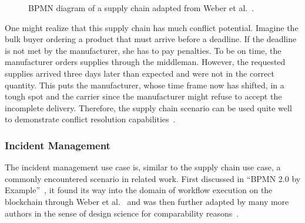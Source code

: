\begin{figure}[h]
    \caption{BPMN diagram of a supply chain adapted from Weber et al.~\cite{untrusted_bp_execution_using_blockchain}.}
    \label{fig:evaluation:simulations:supply_chain_full}
\end{figure}

One might realize that this supply chain has much conflict potential. Imagine the bulk buyer ordering a product that must arrive before a deadline. If the deadline is not met by the manufacturer, she has to pay penalties. To be on time, the manufacturer orders supplies through the middleman. However, the requested supplies arrived three days later than expected and were not in the correct quantity. This puts the manufacturer, whose time frame now has shifted, in a tough spot and the carrier since the manufacturer might refuse to accept the incomplete delivery. Therefore, the supply chain scenario can be used quite well to demonstrate conflict resolution capabilities~\cite{untrusted_bp_execution_using_blockchain,interpreted_bp_on_blockchain_loukil}.

\subsubsection{Incident Management}
\label{sec:evaluation:simulations:descriptions:im}
The incident management use case is, similar to the supply chain use case, a commonly encountered scenario in related work. First discussed in ``BPMN 2.0 by Example''~\cite{omg2010_bpmn_by_example}, it found its way into the domain of workflow execution on the blockchain through Weber et al.~\cite{untrusted_bp_execution_using_blockchain} and was then further adapted by many more authors in the sense of design science for comparability reasons~\cite{optimized_execution_of_bp_using_petri_nets_on_blockchain,interpreted_bp_on_blockchain_weber,lean_architecture_for_blockchain_based_process_execution,interpreted_bp_on_blockchain_loukil}.

